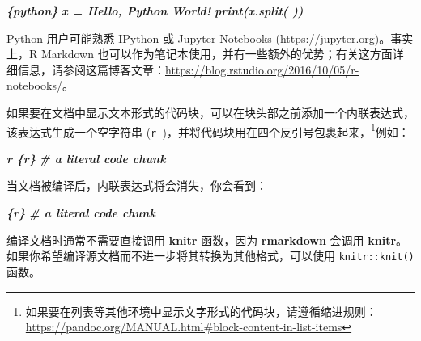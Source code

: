 \documentclass[
  12pt,
]{krantz}
\newenvironment{Shaded}{\begin{snugshade}}{\end{snugshade}}
\newcommand{\InformationTok}[1]{\textcolor[rgb]{0.56,0.35,0.01}{\textbf{\textit{#1}}}}
\theoremstyle{definition}
\theoremstyle{definition}
\theoremstyle{definition}
\theoremstyle{definition}
\theoremstyle{remark}
\begin{document}
\begin{Shaded}
\begin{Highlighting}[]
\InformationTok{\textasciigrave{}\textasciigrave{}\textasciigrave{}\{python\}}
\InformationTok{x = \textquotesingle{}Hello, Python World!\textquotesingle{}}
\InformationTok{print(x.split(\textquotesingle{} \textquotesingle{}))}
\InformationTok{\textasciigrave{}\textasciigrave{}\textasciigrave{}}
\end{Highlighting}
\end{Shaded}

Python 用户可能熟悉 IPython 或 Jupyter Notebooks (\url{https://jupyter.org})。事实上，R Markdown 也可以作为笔记本使用，并有一些额外的优势；有关这方面详细信息，请参阅这篇博客文章：\url{https://blog.rstudio.org/2016/10/05/r-notebooks/}。

如果要在文档中显示文本形式的代码块，可以在块头部之前添加一个内联表达式，该表达式生成一个空字符串 (\texttt{\textasciigrave{}r\ \textquotesingle{}\textquotesingle{}\textasciigrave{}})，并将代码块用在四个反引号包裹起来，\footnote{如果要在列表等其他环境中显示文字形式的代码块，请遵循缩进规则：\url{https://pandoc.org/MANUAL.html\#block-content-in-list-items}}例如：

\begin{Shaded}
\begin{Highlighting}[]
\InformationTok{\textasciigrave{}\textasciigrave{}\textasciigrave{}\textasciigrave{}}
\InformationTok{\textasciigrave{}r \textquotesingle{}\textquotesingle{}\textasciigrave{}\textasciigrave{}\textasciigrave{}\textasciigrave{}\{r\}}
\InformationTok{\# a literal code chunk}
\InformationTok{\textasciigrave{}\textasciigrave{}\textasciigrave{}}
\InformationTok{\textasciigrave{}\textasciigrave{}\textasciigrave{}\textasciigrave{}}
\end{Highlighting}
\end{Shaded}

当文档被编译后，内联表达式将会消失，你会看到：

\begin{Shaded}
\begin{Highlighting}[]
\InformationTok{\textasciigrave{}\textasciigrave{}\textasciigrave{}\{r\}}
\InformationTok{\# a literal code chunk}
\InformationTok{\textasciigrave{}\textasciigrave{}\textasciigrave{}}
\end{Highlighting}
\end{Shaded}

编译文档时通常不需要直接调用 \textbf{knitr} 函数，因为 \textbf{rmarkdown} 会调用 \textbf{knitr}。如果你希望编译源文档而不进一步将其转换为其他格式，可以使用 \texttt{knitr::knit()} 函数。
\end{document}
